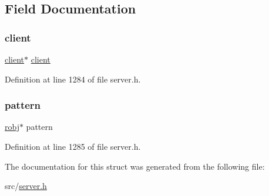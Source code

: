 \subsection{Field Documentation}
\mbox{\label{structpubsub_pattern_a6d99956d3d06c98958feb17baf491c71}} 
\subsubsection{\texorpdfstring{client}{client}}
{\footnotesize\ttfamily \hyperlink{structclient}{client}$\ast$ \hyperlink{structclient}{client}}



Definition at line 1284 of file server.\+h.

\mbox{\label{structpubsub_pattern_a779898a32e09ec217b6876501caecc9c}} 
\subsubsection{\texorpdfstring{pattern}{pattern}}
{\footnotesize\ttfamily \hyperlink{server_8h_a540f174d2685422fbd7d12e3cd44c8e2}{robj}$\ast$ pattern}



Definition at line 1285 of file server.\+h.



The documentation for this struct was generated from the following file\+:\begin{DoxyCompactItemize}
\item 
src/\hyperlink{server_8h}{server.\+h}\end{DoxyCompactItemize}
